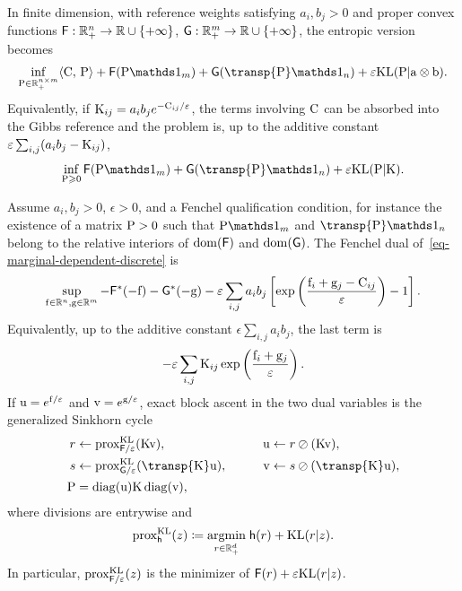 In finite dimension, with reference weights satisfying $a_i,b_j>0$ and proper convex functions $\mathsf F:\RR_+^n\to\RR\cup\{+\infty\}$, $\mathsf G:\RR_+^m\to\RR\cup\{+\infty\}$, the entropic version becomes
\begin{equation}\label{eq-marginal-dependent-discrete}
	\inf_{\P\in\RR_+^{n\times m}}
	\dotp{\C}{\P}
	+
	\mathsf F(\P\ones_m)
	+
	\mathsf G(\transp{\P}\ones_n)
	+
	\epsilon\KLD(\P|\a\otimes\b).
\end{equation}
Equivalently, if $\K_{ij}=a_i b_j e^{-\C_{ij}/\epsilon}$, the terms involving $\C$ can be absorbed into the Gibbs reference and the problem is, up to the additive constant $\epsilon\sum_{i,j}(a_i b_j-\K_{ij})$,
\[
	\inf_{\P\geq0}
	\mathsf F(\P\ones_m)
	+
	\mathsf G(\transp{\P}\ones_n)
	+
	\epsilon\KLD(\P|\K).
\]

\begin{prop}\label{prop-marginal-dependent-dual-scaling}
Assume $a_i,b_j>0$, $\epsilon>0$, and a Fenchel qualification condition, for instance the existence of a matrix $\P>0$ such that $\P\ones_m$ and $\transp{\P}\ones_n$ belong to the relative interiors of $\dom(\mathsf F)$ and $\dom(\mathsf G)$. The Fenchel dual of~\eqref{eq-marginal-dependent-discrete} is
\begin{equation}\label{eq-marginal-dependent-dual}
	\sup_{\fD\in\RR^n,\gD\in\RR^m}
	-
	\mathsf F^*(-\fD)
	-
	\mathsf G^*(-\gD)
	-
	\epsilon\sum_{i,j}a_i b_j
	\left[
		\exp\left(\frac{\fD_i+\gD_j-\C_{ij}}{\epsilon}\right)-1
	\right].
\end{equation}
Equivalently, up to the additive constant $\epsilon\sum_{i,j}a_i b_j$, the last term is
\[
	-
	\epsilon\sum_{i,j}\K_{ij}
	\exp\left(\frac{\fD_i+\gD_j}{\epsilon}\right).
\]
If $\uD=e^{\fD/\epsilon}$ and $\vD=e^{\gD/\epsilon}$, exact block ascent in the two dual variables is the generalized Sinkhorn cycle
\begin{equation}\label{eq-generalized-sinkhorn-kl-prox}
\begin{aligned}
	r &\leftarrow \prox_{\mathsf F/\epsilon}^{\KLD}(\K\vD),
	&\qquad
	\uD &\leftarrow r\oslash(\K\vD),\\
	s &\leftarrow \prox_{\mathsf G/\epsilon}^{\KLD}(\transp{\K}\uD),
	&\qquad
	\vD &\leftarrow s\oslash(\transp{\K}\uD),\\
	\P&=\diag(\uD)\K\diag(\vD),
\end{aligned}
\end{equation}
where divisions are entrywise and
\begin{equation}\label{eq-kl-prox-marginal}
	\prox_{\mathsf h}^{\KLD}(z)
	\eqdef
	\uargmin{r\in\RR_+^d}
	\mathsf h(r)+\KLD(r|z).
\end{equation}
In particular, $\prox_{\mathsf F/\epsilon}^{\KLD}(z)$ is the minimizer of $\mathsf F(r)+\epsilon\KLD(r|z)$.
\end{prop}

